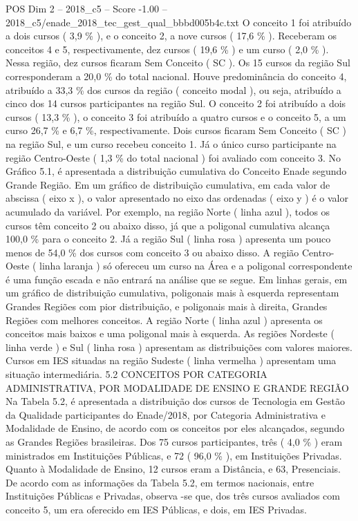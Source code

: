 \begin{textsample}{POS Dim 2 – 2018\_c5 – Score -1.00 – 2018\_c5/enade\_2018\_tec\_gest\_qual\_bbbd005b4c.txt}
O conceito 1 foi atribuído a dois cursos ( 3,9 \% ), e o conceito 2, a nove cursos ( 17,6 \% ).
Receberam os conceitos 4 e 5, respectivamente, dez cursos ( 19,6 \% ) e um curso ( 2,0 \% ).
Nessa região, dez cursos ficaram Sem Conceito ( SC ).
Os 15 cursos da região Sul corresponderam a 20,0 \% do total nacional.
Houve predominância do conceito 4, atribuído a 33,3 \% dos cursos da região ( conceito modal ), ou seja, atribuído a cinco dos 14 cursos participantes na região Sul.
O conceito 2 foi atribuído a dois cursos ( 13,3 \% ), o conceito 3 foi atribuído a quatro cursos e o conceito 5, a um curso 26,7 \% e 6,7 \%, respectivamente.
Dois cursos ficaram Sem Conceito ( SC ) na região Sul, e um curso recebeu conceito 1.
Já o único curso participante na região Centro-Oeste ( 1,3 \% do total nacional ) foi avaliado com conceito 3.
No Gráfico 5.1, é apresentada a distribuição cumulativa do Conceito Enade segundo Grande Região.
Em um gráfico de distribuição cumulativa, em cada valor de abscissa ( eixo x ), o valor apresentado no eixo das ordenadas ( eixo y ) é o valor acumulado da variável.
Por exemplo, na região Norte ( linha azul ), todos os cursos têm conceito 2 ou abaixo disso, já que a poligonal cumulativa alcança 100,0 \% para o conceito 2.
Já a região Sul ( linha rosa ) apresenta um pouco menos de 54,0 \% dos cursos com conceito 3 ou abaixo disso.
A região Centro-Oeste ( linha laranja ) só ofereceu um curso na Área e a poligonal correspondente é uma função escada e não entrará na análise que se segue.
Em linhas gerais, em um gráfico de distribuição cumulativa, poligonais mais à esquerda representam Grandes Regiões com pior distribuição, e poligonais mais à direita, Grandes Regiões com melhores conceitos.
A região Norte ( linha azul ) apresenta os conceitos mais baixos e uma poligonal mais à esquerda.
As regiões Nordeste ( linha verde ) e Sul ( linha rosa ) apresentam as distribuições com valores maiores.
Cursos em IES situadas na região Sudeste ( linha vermelha ) apresentam uma situação intermediária. 5.2 CONCEITOS POR CATEGORIA ADMINISTRATIVA, POR MODALIDADE DE ENSINO E GRANDE REGIÃO Na Tabela 5.2, é apresentada a distribuição dos cursos de Tecnologia em Gestão da Qualidade participantes do Enade/2018, por Categoria Administrativa e Modalidade de Ensino, de acordo com os conceitos por eles alcançados, segundo as Grandes Regiões brasileiras.
Dos 75 cursos participantes, três ( 4,0 \% ) eram ministrados em Instituições Públicas, e 72 ( 96,0 \% ), em Instituições Privadas.
Quanto à Modalidade de Ensino, 12 cursos eram a Distância, e 63, Presenciais.
De acordo com as informações da Tabela 5.2, em termos nacionais, entre Instituições Públicas e Privadas, observa -se que, dos três cursos avaliados com conceito 5, um era oferecido em IES Públicas, e dois, em IES Privadas.

\end{textsample}
